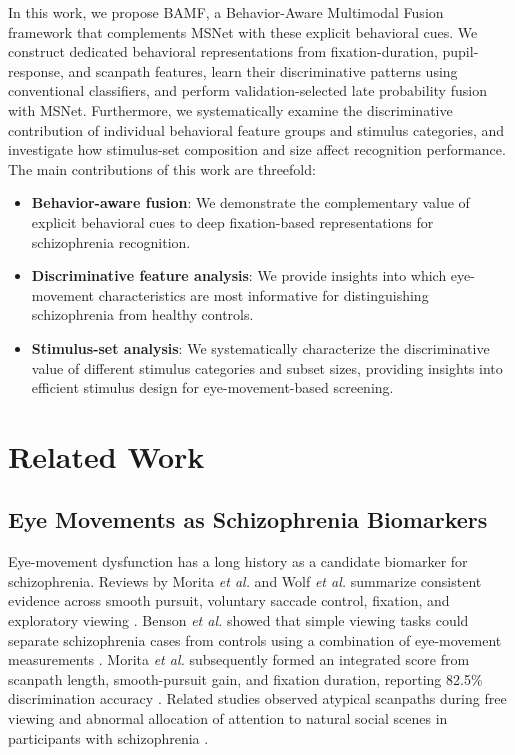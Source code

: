 \documentclass[conference,a4paper]{IEEEtran}
\begin{document}
In this work, we propose BAMF, a Behavior-Aware Multimodal Fusion framework that complements MSNet with these explicit behavioral cues. We construct dedicated behavioral representations from fixation-duration, pupil-response, and scanpath features, learn their discriminative patterns using conventional classifiers, and perform validation-selected late probability fusion with MSNet. Furthermore, we systematically examine the discriminative contribution of individual behavioral feature groups and stimulus categories, and investigate how stimulus-set composition and size affect recognition performance. The main contributions of this work are threefold:
\begin{itemize}
    \item \textbf{Behavior-aware fusion}: We demonstrate the complementary value of explicit behavioral cues to deep fixation-based representations for schizophrenia recognition.
    \item \textbf{Discriminative feature analysis}: We provide insights into which eye-movement characteristics are most informative for distinguishing schizophrenia from healthy controls.
    \item \textbf{Stimulus-set analysis}: We systematically characterize the discriminative value of different stimulus categories and subset sizes, providing insights into efficient stimulus design for eye-movement-based screening.
\end{itemize}

\section{Related Work}
\subsection{Eye Movements as Schizophrenia Biomarkers}
Eye-movement dysfunction has a long history as a candidate biomarker for schizophrenia. Reviews by Morita \emph{et al.} and Wolf \emph{et al.} summarize consistent evidence across smooth pursuit, voluntary saccade control, fixation, and exploratory viewing \cite{morita2020characteristics,wolf2021review}. Benson \emph{et al.} showed that simple viewing tasks could separate schizophrenia cases from controls using a combination of eye-movement measurements \cite{benson2012simple}. Morita \emph{et al.} subsequently formed an integrated score from scanpath length, smooth-pursuit gain, and fixation duration, reporting 82.5\% discrimination accuracy \cite{morita2017integrated}. Related studies observed atypical scanpaths during free viewing and abnormal allocation of attention to natural social scenes in participants with schizophrenia \cite{patel2020social}.
\end{document}
